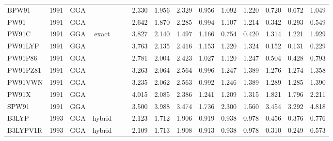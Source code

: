 \begin{landscape}
\begin{longtable}{ll:cccc:rrr:rrr:rrr}
    BPW91            & 1991 & GGA  &          &             &           & 2.330             & 1.956             & 2.329  & 0.956              & 1.092             & 1.220  & 0.720   & 0.672 & 1.049 \\
    PW91             & 1991 & GGA  &          &             &           & 2.642             & 1.870             & 2.285  & 0.994              & 1.107             & 1.214  & 0.342   & 0.293 & 0.549 \\
    PW91C            & 1991 & GGA  & exact    &             &           & 3.827             & 2.140             & 1.497  & 1.166              & 0.754             & 0.420  & 1.314   & 1.221 & 1.929 \\
    PW91LYP          & 1991 & GGA  &          &             &           & 3.763             & 2.135             & 2.416  & 1.153              & 1.220             & 1.324  & 0.152   & 0.131 & 0.229 \\
    PW91P86          & 1991 & GGA  &          &             &           & 2.781             & 2.004             & 2.423  & 1.027              & 1.120             & 1.247  & 0.504   & 0.428 & 0.793 \\
    PW91PZ81         & 1991 & GGA  &          &             &           & 3.263             & 2.064             & 2.564  & 0.996              & 1.247             & 1.389  & 1.276   & 1.274 & 1.358 \\
    PW91VWN          & 1991 & GGA  &          &             &           & 3.235             & 2.062             & 2.563  & 0.992              & 1.246             & 1.389  & 1.289   & 1.285 & 1.390 \\
    PW91X            & 1991 & GGA  &          &             &           & 4.015             & 2.085             & 2.386  & 1.241              & 1.209             & 1.315  & 1.821   & 1.796 & 2.211 \\
    SPW91            & 1991 & GGA  &          &             &           & 3.500             & 3.988             & 3.474  & 1.736              & 2.300             & 1.560  & 3.454   & 3.292 & 4.818 \\
    B3LYP            & 1993 & GGA  & hybrid   &             &           & 2.123             & 1.712             & 1.906  & 0.919              & 0.938             & 0.978  & 0.456   & 0.376 & 0.776 \\
    B3LYPV1R         & 1993 & GGA  & hybrid   &             &           & 2.109             & 1.713             & 1.908  & 0.913              & 0.938             & 0.978  & 0.310   & 0.249 & 0.573 \\

\end{longtable}
\end{landscape}
